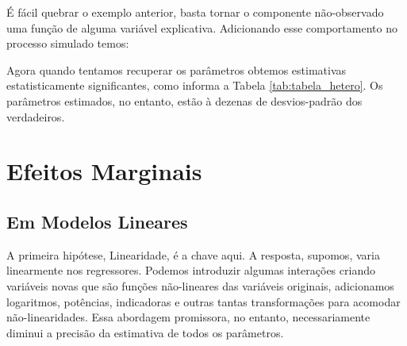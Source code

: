 \begin{exemplo}[Heterocedasticidade]
É fácil quebrar o exemplo anterior, basta tornar o componente não-observado uma função de alguma variável explicativa. Adicionando esse comportamento no processo simulado temos:

\begin{figure}[H]
    \centering
    
\end{figure}



Agora quando tentamos recuperar os parâmetros obtemos estimativas estatisticamente significantes, como informa a Tabela \ref{tab:tabela_hetero}. Os parâmetros estimados, no entanto, estão à dezenas de desvios-padrão dos verdadeiros.


\end{exemplo}





\section{Efeitos Marginais}
\subsection{Em Modelos Lineares}
A primeira hipótese, Linearidade, é a chave aqui. A resposta, supomos, varia linearmente nos regressores. Podemos introduzir algumas interações criando variáveis novas que são funções não-lineares das variáveis originais, adicionamos logaritmos, potências, indicadoras e outras tantas transformações para acomodar não-linearidades. Essa abordagem promissora, no entanto, necessariamente diminui a precisão da estimativa de todos os parâmetros.

